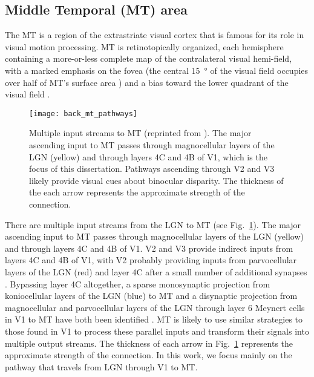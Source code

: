 \subsection{Middle Temporal (MT) area}
\label{sec:BKG|MT}

The \acf{MT} is a region of the extrastriate visual cortex that is
famous for its role in visual motion processing.
\ac{MT} is retinotopically organized, each hemisphere containing a
more-or-less complete map of the contralateral visual hemi-field,
with a marked emphasis on the fovea
(the central \SI{15}{\degree} of the visual field occupies over half
of \ac{MT}'s surface area \citep{vanEssen1981}) and 
a bias toward the lower quadrant of the visual field
\citep{MaunsellVanEssen1987}.

\begin{figure}[t]
  \centering
  \texttt{[image: back\_mt\_pathways]}
  \caption{
  Multiple input streams to \ac{MT} (reprinted from \cite{NassiCallaway2009}).
  The major ascending input to \ac{MT} passes through magnocellular layers
  of the \ac{LGN} (yellow) and through layers 4C\textalpha{} and 4B of
  \ac{V1}, which is the focus of this dissertation.
  Pathways ascending through V2 and V3 likely provide visual cues about
  binocular disparity.
  The thickness of the each arrow represents the approximate strength of the
  connection.
  }
  \label{fig:BKG|MT|pathway}
\end{figure}

There are multiple input streams from the \ac{LGN} to \ac{MT}
(see Fig.~\ref{fig:BKG|MT|pathway}).
The major ascending input to \ac{MT} passes through magnocellular
layers of the \ac{LGN} (yellow) and through layers 4C\textalpha{} 
and 4B of \ac{V1}. V2 and V3 provide indirect
inputs from layers 4C\textalpha{} and 4B of \ac{V1}, with V2 probably
providing inputs from parvocellular layers of the \ac{LGN} (red)
and layer 4C\textbeta{} after a small number of additional
synapses \citep{NassiCallaway2009}. 
Bypassing layer 4C altogether, a sparse monosynaptic projection 
from koniocellular layers of the \ac{LGN} (blue) to \ac{MT}
and a disynaptic projection from magnocellular and parvocellular layers 
of the \ac{LGN} through layer 6 Meynert cells in \ac{V1} to \ac{MT}
have both been identified \citep{NassiCallaway2009}. 
\ac{MT} is likely to use similar strategies to those
found in \ac{V1} to process these parallel inputs and transform
their signals into multiple output streams. The thickness of
each arrow in Fig.~\ref{fig:BKG|MT|pathway} represents the 
approximate strength of the connection.
In this work, we focus mainly on the pathway that travels from \ac{LGN}
through \ac{V1} to \ac{MT}.

